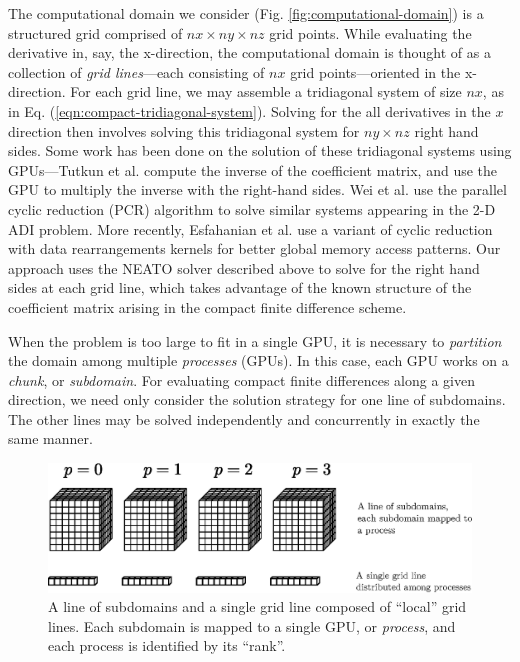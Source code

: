 \documentclass{elsarticle}
\begin{document}
The computational domain we consider
(Fig. \ref{fig:computational-domain})
is a structured grid comprised of
$nx \times ny \times nz$ grid points.
While evaluating the derivative in, say, the x-direction,
the computational domain is thought of as
a collection of \emph{grid lines}---each consisting of
$nx$ grid points---oriented in the x-direction.
For each grid line,
we may assemble a tridiagonal system of size $nx$, as in
Eq. (\ref{eqn:compact-tridiagonal-system}).
Solving for the all derivatives in the $x$ direction then involves
solving this tridiagonal system for $ny \times nz$ right hand sides.
Some work has been done on the solution of these
tridiagonal systems using GPUs---Tutkun et al.
\cite{tutkun2012gpu} compute the inverse of the coefficient matrix,
and use the GPU to multiply the inverse with the right-hand sides.
Wei et al. \cite{wei2013parallelizing}
use the parallel cyclic reduction (PCR) algorithm
to solve similar systems appearing in
the 2-D ADI problem.
More recently, Esfahanian et al. \cite{esfahanian2014efficient}
use a variant of cyclic reduction with
data rearrangements kernels for better global memory access patterns.
Our approach uses the NEATO solver described above
to solve for the right hand sides at each grid line,
which takes advantage of the known structure
of the coefficient matrix arising
in the compact finite difference scheme.

When the problem is too large to fit in a single GPU,
it is necessary to \emph{partition} the domain
among multiple \emph{processes} (GPUs).
In this case, each GPU works on a \emph{chunk}, or \emph{subdomain}.
For evaluating compact finite differences along a given direction,
we need only consider the solution strategy for
one line of subdomains.
The other lines may be solved independently and concurrently
in exactly the same manner.

\begin{figure}
\begin{center}
\includegraphics[width=350pt]{img/subdomains-grid-lines.eps}
\caption{A line of subdomains and a single grid line composed of ``local'' grid lines.
    Each subdomain is mapped to a single GPU, or \emph{process},
    and each process is identified by its ``rank''.}
\label{fig:subdomains-grid-lines}
\end{center}
\end{figure}
\end{document}
